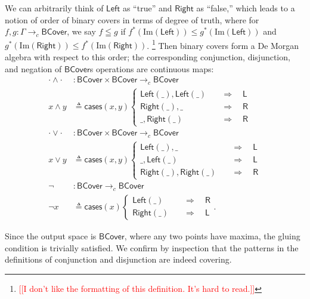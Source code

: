 \documentclass[conference]{IEEEtran}
\newcommand{\cto}{\to_c}
\newcommand{\wildcard}{\_}
\newcommand{\Img}[1]{\text{Im}\left({#1}\right)}
\newcommand{\Branch}{\Rightarrow}
\newcommand{\BCover}{\mathsf{BCover}}
\newcommand{\iimg}[1]{{#1}^*}
\newcommand{\note}[1]{\textcolor{red}{[[{#1}]]}}
\begin{document}
We can arbitrarily think of $\mathsf{Left}$ as ``true'' and $\mathsf{Right}$ as ``false,'' which leads to a notion of order of binary covers in terms of degree of truth, where for $f, g : \Gamma \cto \BCover$, we say $f \leqq g$ if $\iimg{f}(\Img{\mathsf{Left}}) \le \iimg{g}(\Img{\mathsf{Left}})$ and $\iimg{g}(\Img{\mathsf{Right}}) \le \iimg{f}(\Img{\mathsf{Right}})$.
\footnote{\note{I don't like the formatting of this definition. It's hard to read.}} 
Then binary covers form a De Morgan algebra with respect to this order; the corresponding conjunction, disjunction, and negation of $\BCover$s operations are continuous maps:
\begin{align*}
\cdot \wedge \cdot &: \BCover \times \BCover \cto \BCover
\\ x \wedge y &\triangleq \mathsf{cases}(x, y)
\begin{cases}
\mathsf{Left}(\wildcard), \mathsf{Left}(\wildcard)
 \quad &\Branch \quad
 \mathsf{L}
\\
\mathsf{Right}(\wildcard), \wildcard
 \quad &\Branch \quad
 \mathsf{R}
\\
\wildcard, \mathsf{Right}(\wildcard)
 \quad &\Branch \quad
 \mathsf{R}
\end{cases}
\\
\cdot \vee \cdot &: \BCover \times \BCover \cto \BCover
\\ x \vee y &\triangleq \mathsf{cases}(x, y)
\begin{cases}
\mathsf{Left}(\wildcard), \wildcard
 \quad &\Branch \quad
 \mathsf{L}
\\
\wildcard, \mathsf{Left}(\wildcard)
 \quad &\Branch \quad
 \mathsf{L}
\\
 \mathsf{Right}(\wildcard), \mathsf{Right}(\wildcard)
 \quad &\Branch \quad
 \mathsf{R}
\end{cases}
\\
\neg &: \BCover \cto \BCover
\\ \neg x &\triangleq \mathsf{cases}(x)
\begin{cases}
\mathsf{Left}(\wildcard)
 \quad &\Branch \quad
 \mathsf{R}
\\
\mathsf{Right}(\wildcard)
 \quad &\Branch \quad
 \mathsf{L}
\end{cases}.
\end{align*}

Since the output space is $\BCover$, where any two points have maxima, the gluing condition is trivially satisfied. We confirm by inspection that the patterns in the definitions of conjunction and disjunction are indeed covering.
\end{document}
